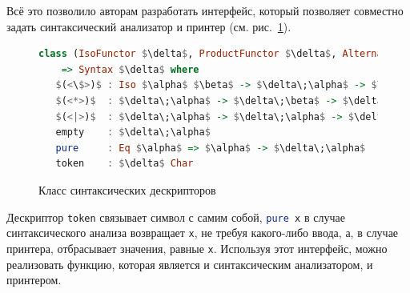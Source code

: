 Всё это позволило авторам разработать интерфейс, который позволяет совместно задать синтаксический анализатор и принтер (см. рис.~\ref{ClassSyntDesc}).

\begin{figure}[ht]
\centering
\begin{lstlisting}[mathescape,language = haskell]
class (IsoFunctor $\delta$, ProductFunctor $\delta$, Alternative $\delta$) 
    => Syntax $\delta$ where
   $(<\$>)$ : Iso $\alpha$ $\beta$ -> $\delta\;\alpha$ -> $\delta\;\beta$
   $(<*>)$  : $\delta\;\alpha$ -> $\delta\;\beta$ -> $\delta$ ($\alpha$, $\beta$)
   $(<|>)$  : $\delta\;\alpha$ -> $\delta\;\alpha$ -> $\delta\;\alpha$
   empty    : $\delta\;\alpha$
   pure     : Eq $\alpha$ => $\alpha$ -> $\delta\;\alpha$
   token    : $\delta$ Char
\end{lstlisting}
\caption{Класс синтаксических дескрипторов}
\label{ClassSyntDesc}
\end{figure}

Дескриптор \lstinline[language=Haskell]{token} связывает символ с самим собой, \lstinline[language=Haskell]{pure x} 
в случае синтаксического анализа возвращает \lstinline[language=Haskell]{x}, не требуя какого-либо ввода, а, в случае 
принтера, отбрасывает значения, равные \lstinline[language=Haskell]{x}. Используя этот интерфейс, можно 
реализовать функцию, которая является и синтаксическим анализатором, и принтером.

